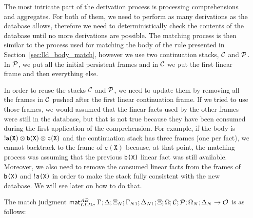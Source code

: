The most intricate part of the derivation process is processing comprehensions
and aggregates. For both of them, we need to perform as many derivations as the
database allows, therefore we need to deterministically check the contents of
the database until no more derivations are possible.  The matching process is
then similar to the process used for matching the body of the rule presented in
Section~\ref{sec:lld_body_match}, however we use two continuation stacks,
$\mathcal{C}$ and $\mathcal{P}$. In $\mathcal{P}$, we put all the initial
persistent frames and in $\mathcal{C}$ we put the first linear frame and then
everything else.

In order to reuse the stacks $\mathcal{C}$ and $\mathcal{P}$, we need to update them by removing all
the frames in $\mathcal{C}$ pushed after the first linear continuation frame.  If we tried
to use those frames, we would assumed that the linear facts used by the other
frames were still in the database, but that is not true because they have been
consumed during the first application of the comprehension.  For example, if the
body is ${!} \mathtt{a(X)} \otimes \mathtt{b(X)} \otimes \mathtt{c(X)}$ and
the continuation stack has three frames (one per fact), we cannot backtrack to
the frame of $\mathtt{c(X)}$ because, at that point, the matching process was
assuming that the previous \texttt{b(X)} linear fact was still available.
Moreover, we also need to remove the consumed linear facts from the frames of
\texttt{b(X)} and ${!}$\texttt{a(X)} in order to make the stack fully
consistent with the new database. We will see later on how to do that.

The match judgment $\mathsf{mat}_{LLDc}^{AB} \; \Gamma; \Delta; \Xi_N; \Gamma_{N1}; \Delta_{N1};
\Xi; \Omega; \mathcal{C}; \mathcal{P}; \Omega_N; \Delta_N \rightarrow \mathcal{O}$ is
as follows:

